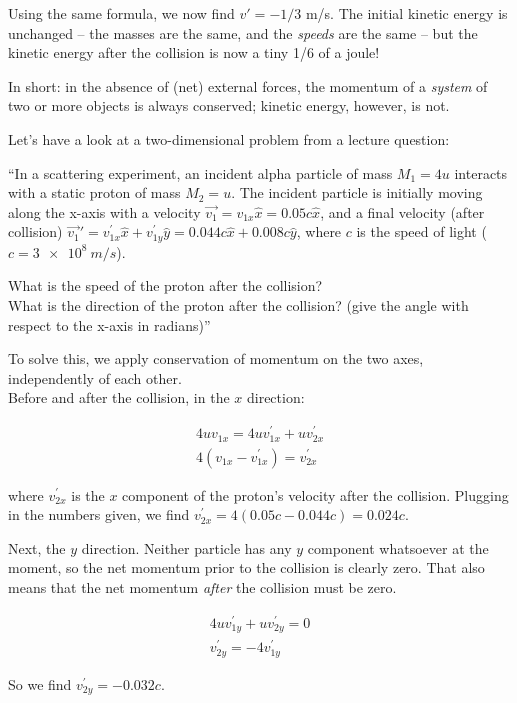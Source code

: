 Using the same formula, we now find $v' = -1/3$ m/s. The initial kinetic energy is unchanged -- the masses are the same, and the \emph{speeds} are the same -- but the kinetic energy after the collision is now a tiny 1/6 of a joule!

In short: in the absence of (net) external forces, the momentum of a \emph{system} of two or more objects is always conserved; kinetic energy, however, is not.

Let's have a look at a two-dimensional problem from a lecture question:

``In a scattering experiment, an incident alpha particle of mass $M_1 = 4u$ interacts with a static proton of mass $M_2 = u$. The incident particle is initially moving along the x-axis with a velocity $\vec{v_1} = v_{1x} \hat{x} = 0.05 c \hat{x}$, and a final velocity (after collision) $\vec{v_1}' = v_{1x}^{'} \hat{x} + v_{1y}^{'} \hat{y} = 0.044 c \hat{x} + 0.008 c \hat{y}$, where $c$ is the speed of light ($c = \SI{3e8}{m/s}$).

What is the speed of the proton after the collision?\\
What is the direction of the proton after the collision? (give the angle with respect to the x-axis in radians)''

To solve this, we apply conservation of momentum on the two axes, independently of each other.\\
Before and after the collision, in the $x$ direction:

\begin{align}
4 u v_{1x} = 4 u v_{1x}^{'} + u v_{2x}^{'}\\
4 (v_{1x} - v_{1x}^{'}) = v_{2x}^{'}
\end{align}

where $v_{2x}^{'}$ is the $x$ component of the proton's velocity after the collision. Plugging in the numbers given, we find $v_{2x}^{'} = 4(0.05c - 0.044c) = 0.024c$.

Next, the $y$ direction. Neither particle has any $y$ component whatsoever at the moment, so the net momentum prior to the collision is clearly zero. That also means that the net momentum \emph{after} the collision must be zero.

\begin{align}
4 u v_{1y}^{'} + u v_{2y}^{'} = 0\\
v_{2y}^{'} = -4 v_{1y}^{'}
\end{align}

So we find $v_{2y}^{'} = -0.032c$.

